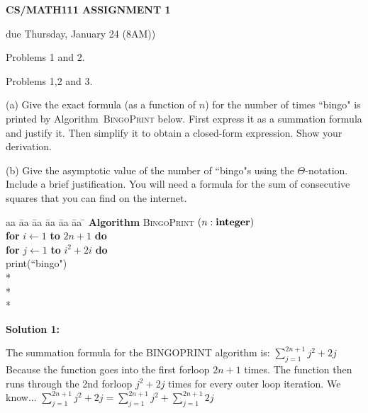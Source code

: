 \documentclass{article}
\begin{document}

\medskip



\centerline{\large \bf CS/MATH111 ASSIGNMENT 1}
\centerline{due Thursday, January 24 (8AM))}

\vskip 0.1in
 Problems 1 and 2.

 Problems 1,2 and 3.

\vskip 0.2in


\begin{problem}
(a)
Give the exact formula (as a function of $n$) for the number of
times ``bingo" is printed by Algorithm~\textsc{BingoPrint} below.
First express it as a summation formula and justify it. Then simplify it to 
obtain a closed-form expression. Show your derivation.

\noindent
(b)
Give the asymptotic value of the
number of ``bingo"s using the $\Theta$-notation. Include a brief justification. You will need a formula
for the sum of consecutive squares that you can find on the internet.

\begin{tabbing}
aa \= aa \= aa \= aa \= aa \= aa \= \kill
\textbf{Algorithm} \textsc{BingoPrint} $(n: \mbox{\bf integer})$ \\
      \> \textbf{for} $i \leftarrow 1$ \textbf{to} $2n+1$
                         \textbf{do} \\
      \> \> \textbf{for} $j \leftarrow 1$ \textbf{to} $i^2+2i$ \textbf{do} \\
      \> \> \> print(``bingo")
      \\* \\* \\*
\end{tabbing}
\end{problem}


\textbf{Solution 1:} 

The summation formula for the BINGOPRINT algorithm is: 
$\displaystyle\sum\limits_{j=1}^{2n+1} j^2+2j$
Because the function goes into the first forloop $2n+1$ times. The function then runs through the 2nd forloop $j^2 + 2j$ times for every outer loop iteration.
We know...
$\displaystyle\sum\limits_{j=1}^{2n+1} j^2+2j = \sum\limits_{j=1}^{2n+1} j^2 + \sum\limits_{j=1}^{2n+1} 2j$
\end{document}
